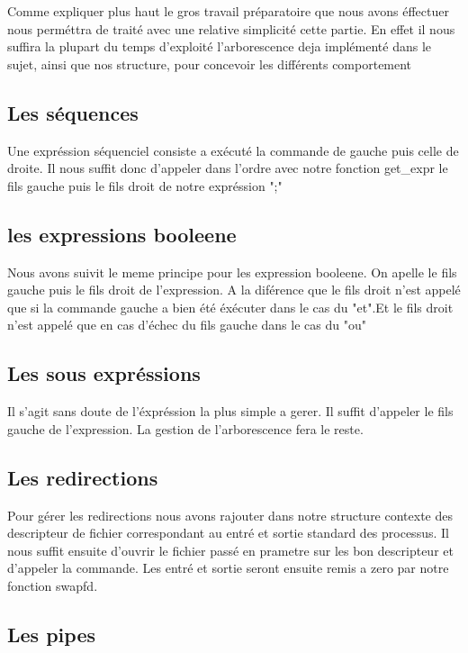 \documentclass[12pt]{article}
\begin{document}
Comme expliquer plus haut le gros travail préparatoire que nous avons éffectuer nous perméttra
de traité avec une relative simplicité cette partie. En effet il nous suffira la plupart du temps 
d'exploité l'arborescence deja implémenté dans le sujet, ainsi que nos structure, pour concevoir
les différents comportement

\subsection{Les séquences}

Une expréssion séquenciel consiste a exécuté la commande de gauche puis celle de droite.
Il nous suffit donc d'appeler dans l'ordre avec notre fonction get\_expr le fils gauche puis le fils
droit de notre expréssion ";"

\subsection{les expressions booleene}

Nous avons suivit le meme principe pour les expression booleene. On apelle le fils gauche puis
le fils droit de l'expression.
A la diférence que le fils droit n'est appelé que si la commande gauche a bien été éxécuter dans le
cas du "et".Et le fils droit n'est appelé que en cas d'échec du fils gauche dans le cas du "ou"

\subsection{Les sous expréssions}

Il s'agit sans doute de l'éxpréssion la plus simple a gerer. Il suffit d'appeler le fils
gauche de l'expression. La gestion de l'arborescence fera le reste.

\subsection{Les redirections}

Pour gérer les redirections nous avons rajouter dans notre structure contexte des descripteur
de fichier correspondant au entré et sortie standard des processus. Il nous suffit ensuite 
d'ouvrir le fichier passé en prametre sur les bon descripteur et d'appeler la commande.
Les entré et sortie seront ensuite remis a zero par notre fonction swapfd.

\subsection{Les pipes}
\end{document}
